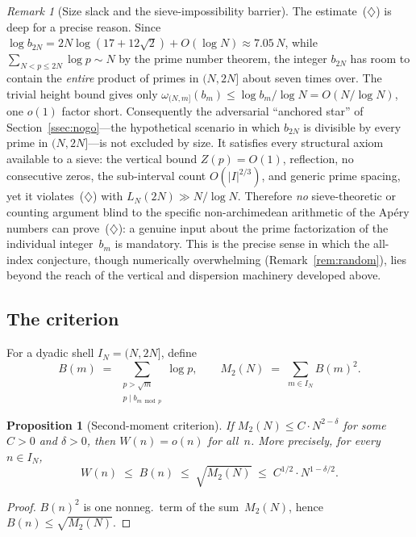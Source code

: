 \documentclass[11pt]{article}
\newtheorem{proposition}[theorem]{Proposition}
\theoremstyle{definition}
\theoremstyle{remark}
\newtheorem{remark}[theorem]{Remark}
\begin{document}
\begin{remark}[Size slack and the sieve-impossibility barrier]
\label{rem:size-slack}
The estimate~(\ensuremath{\diamondsuit}) is deep for a precise
reason.  Since
$\log b_{2N} = 2N\log(17+12\sqrt2) + O(\log N)
\approx 7.05\,N$, while
$\sum_{N < p \le 2N}\log p \sim N$ by the prime number
theorem, the integer $b_{2N}$ has room to contain the
\emph{entire} product of primes in $(N, 2N]$ about
seven times over.  The trivial height bound gives only
$\omega_{(N,m]}(b_m) \le \log b_m/\log N = O(N/\!\log N)$,
one $o(1)$ factor short.
Consequently the adversarial ``anchored star'' of
Section~\ref{ssec:nogo}---the hypothetical scenario in
which $b_{2N}$ is divisible by every prime in
$(N, 2N]$---is not excluded by size.  It satisfies every
structural axiom available to a sieve: the vertical bound
$Z(p) = O(1)$, reflection, no consecutive zeros, the
sub-interval count $O(|I|^{2/3})$, and generic prime
spacing, yet it violates~(\ensuremath{\diamondsuit}) with
$L_N(2N) \gg N/\!\log N$.
Therefore \emph{no} sieve-theoretic or counting argument
blind to the specific non-archimedean arithmetic of the
Ap\'ery numbers can prove~(\ensuremath{\diamondsuit}):
a genuine input about the prime factorization of the
individual integer~$b_m$ is mandatory.
This is the precise sense in which the all-index
conjecture, though numerically overwhelming
(Remark~\ref{rem:random}), lies beyond the reach of the
vertical and dispersion machinery developed above.
\end{remark}

\subsection{The criterion}

For a dyadic shell $I_N = (N, 2N]$, define
\[
  B(m) \;=\; \sum_{\substack{p > \sqrt{m} \\ p \mid b_{m \bmod p}}}
  \!\log p,
  \qquad
  M_2(N) \;=\; \sum_{m \in I_N} B(m)^2.
\]

\begin{proposition}[Second-moment criterion]\label{prop:M2}
If $M_2(N) \le C\cdot N^{2-\delta}$ for some $C > 0$
and $\delta > 0$, then $W(n) = o(n)$ for all~$n$.
More precisely, for every $n \in I_N$,
\[
  W(n) \;\le\; B(n) \;\le\; \sqrt{M_2(N)}
  \;\le\; C^{1/2}\cdot N^{1-\delta/2}.
\]
\end{proposition}

\begin{proof}
$B(n)^2$ is one nonneg.\ term of the
sum~$M_2(N)$, hence $B(n) \le \sqrt{M_2(N)}$.
\end{proof}
\end{document}
